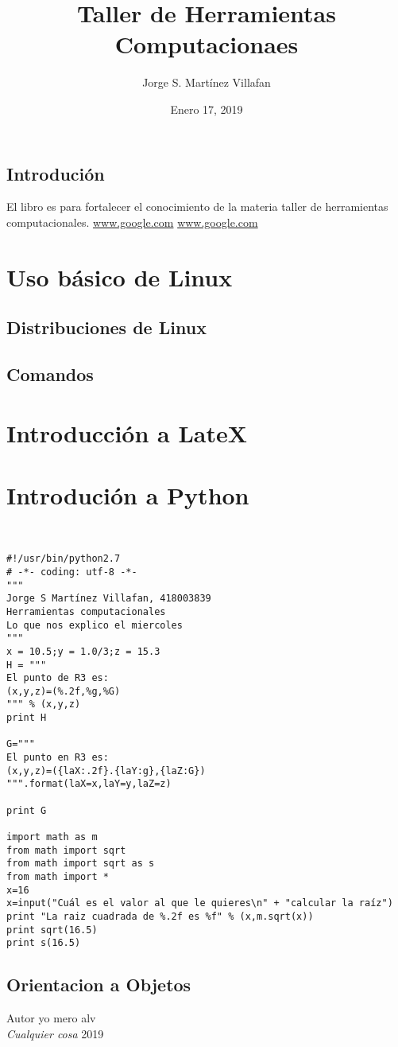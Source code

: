 \documentclass{book}
\title{ Taller de Herramientas Computacionaes}
\author{Jorge S. Martínez Villafan}
\date{Enero 17, 2019}
\begin{document}
\maketitle
\tableofcontents
\section*{Introdución} El libro es para fortalecer el conocimiento de la materia taller de herramientas computacionales.
\url{www.google.com}
\hyperref[Google]{www.google.com}
\chapter{Uso básico de Linux}
\section{Distribuciones de Linux}
\section{Comandos}

\chapter{Introducción a LateX}
\chapter{Introdución a Python}
\begin{verbatim}


#!/usr/bin/python2.7
# -*- coding: utf-8 -*-
"""
Jorge S Martínez Villafan, 418003839
Herramientas computacionales
Lo que nos explico el miercoles
"""
x = 10.5;y = 1.0/3;z = 15.3
H = """
El punto de R3 es:
(x,y,z)=(%.2f,%g,%G)
""" % (x,y,z)
print H

G="""
El punto en R3 es:
(x,y,z)=({laX:.2f}.{laY:g},{laZ:G})
""".format(laX=x,laY=y,laZ=z)

print G

import math as m
from math import sqrt
from math import sqrt as s
from math import *
x=16
x=input("Cuál es el valor al que le quieres\n" + "calcular la raíz")
print "La raiz cuadrada de %.2f es %f" % (x,m.sqrt(x))
print sqrt(16.5)
print s(16.5)
\end{verbatim}

%

\section{Orientacion a Objetos}

\begin{thebibliography}{9}
Autor yo mero alv\\
\textit{Cualquier cosa} 2019
\end{thebibliography}
	
	
\end{document}

